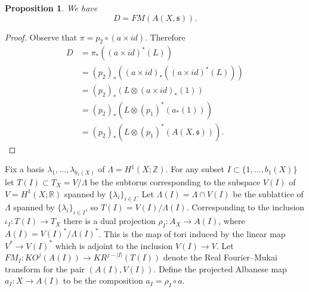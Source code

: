 \documentclass{amsart}
\newtheorem{proposition}[theorem]{Proposition}
\theoremstyle{definition}
\theoremstyle{remark}
\numberwithin{equation}{section}
\begin{document}
\begin{proposition}\label{prop:dfm}
We have
\[
D = FM( A(X,\mathfrak{s}) ).
\]
\end{proposition}
\begin{proof}
Observe that $\pi = p_2 \circ (a \times id)$. Therefore
\begin{align*}
D &= \pi_*( (a \times id)^*(L) ) \\
&= (p_2)_* ( (a \times id)_*(  (a \times id)^*(L) ) ) \\
&= (p_2)_*( L \otimes (a \times id)_*(1) ) \\
&= (p_2)_*( L \otimes (p_1)^*( a_*(1) ) ) \\
&= (p_2)_*( L \otimes (p_1)^*(A(X , \mathfrak{s})) ).
\end{align*}
\end{proof}


Fix a basis $\lambda_1 , \dots , \lambda_{b_1(X)}$ of $\Lambda = H^1(X ; \mathbb{Z})$. For any subset $I \subset \{1,\dots , b_1(X) \}$ let $T(I) \subset T_X = V/\Lambda$ be the subtorus corresponding to the subspace $V(I)$ of $V = H^1(X ; \mathbb{R})$ spanned by $\{ \lambda_i \}_{i \in I}$. Let $\Lambda(I) = \Lambda \cap V(I)$ be the sublattice of $\Lambda$ spanned by $\{ \lambda_i \}_{i \in I}$, so $T(I) = V(I)/\Lambda(I)$. Corresponding to the inclusion $\iota_I : T(I) \to T_X$ there is a dual projection $\rho_I : A_X \to A(I)$, where $A(I) = V(I)^*/\Lambda(I)^*$. This is the map of tori induced by the linear map $V^* \to V(I)^*$ which is adjoint to the inclusion $V(I) \to V$. Let $FM_I : KO^j( A(I) ) \to KR^{j-|I|}( T(I) )$ denote the Real Fourier--Mukai transform for the pair $( A(I) , V(I) )$. Define the projected Albanese map $a_I : X \to A(I)$ to be the composition $a_I = \rho_I \circ a$.
\end{document}
